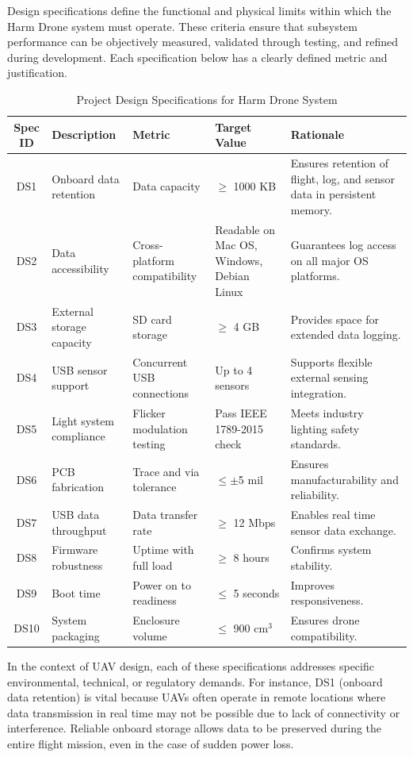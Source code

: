 \documentclass[12pt]{article}
\begin{document}
\par Design specifications define the functional and physical limits within which the Harm Drone system must operate. These criteria ensure that subsystem performance can be objectively measured, validated through testing, and refined during development. Each specification below has a clearly defined metric and justification.

\begin{table}[H]
\centering
\begin{tabular}{|c|p{3cm}|p{3cm}|p{3cm}|p{4cm}|}
\hline
\textbf{Spec ID} & \textbf{Description} & \textbf{Metric} & \textbf{Target Value} & \textbf{Rationale} \\
\hline
DS1 & Onboard data retention & Data capacity & $\geq$ 1000 KB & Ensures retention of flight, log, and sensor data in persistent memory. \\
\hline
DS2 & Data accessibility & Cross-platform compatibility & Readable on Mac OS, Windows, Debian Linux & Guarantees log access on all major OS platforms. \\
\hline
DS3 & External storage capacity & SD card storage & $\geq$ 4 GB & Provides space for extended data logging. \\
\hline
DS4 & USB sensor support & Concurrent USB connections & Up to 4 sensors & Supports flexible external sensing integration. \\
\hline
DS5 & Light system compliance & Flicker modulation testing & Pass IEEE 1789-2015 check & Meets industry lighting safety standards. \\
\hline
DS6 & PCB fabrication & Trace and via tolerance & $\leq \pm$5 mil & Ensures manufacturability and reliability. \\
\hline
DS7 & USB data throughput & Data transfer rate & $\geq$ 12 Mbps & Enables real time sensor data exchange. \\
\hline
DS8 & Firmware robustness & Uptime with full load & $\geq$ 8 hours & Confirms system stability. \\
\hline
DS9 & Boot time & Power on to readiness & $\leq$ 5 seconds & Improves responsiveness. \\
\hline
DS10 & System packaging & Enclosure volume & $\leq$ 900 cm$^3$ & Ensures drone compatibility. \\
\hline
\end{tabular}
\caption{Project Design Specifications for Harm Drone System}
\end{table}

\par In the context of UAV design, each of these specifications addresses specific environmental, technical, or regulatory demands. For instance, DS1 (onboard data retention) is vital because UAVs often operate in remote locations where data transmission in real time may not be possible due to lack of connectivity or interference. Reliable onboard storage allows data to be preserved during the entire flight mission, even in the case of sudden power loss.
\end{document}
